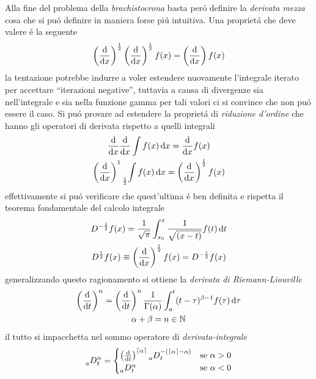 \begin{multicols*}{3}
  Alla fine del problema della \textit{brachistocrona} basta per\'o definire la \textit{derivata mezza}
  cosa che si pu\'o definire in maniera forse pi\'u intuitiva. Una propriet\'a che deve valere \'e la
  seguente
  \begin{equation}
    \left(\dv{x}\right)^{\frac{1}{2}}\left(\dv{x}\right)^{\frac{1}{2}} f(x) = \left(\dv{x}\right)f(x)
  \end{equation}
  la tentazione potrebbe indurre a voler estendere nuovamente l'integrale iterato per accettare
  ``iterazioni negative'', tuttavia a causa di divergenze sia nell'integrale e sia nella funzione gamma
  per tali valori ci si convince che non pu\'o essere il caso.
  Si pu\'o provare ad estendere la propriet\'a di \textit{riduzione d'ordine} che hanno gli operatori di
  derivata rispetto a quelli integrali
  \begin{equation}
    \begin{gathered}
      \dv{x}\dv{x}\int f(x)\dd{x} = \dv{x}f(x) \\
      \left(\dv{x}\right)^1 \prescript{}{\frac{1}{2}}{\int f(x)\dd{x}} = \left(\dv{x}\right)^{\frac{1}{2}} f(x)
    \end{gathered}
  \end{equation}
  effettivamente si pu\'o verificare che quest'ultima \'e ben definita e rispetta il teorema fondamentale del
  calcolo integrale
  \begin{equation}
    \begin{gathered}
      D^{-\frac{1}{2}}f(x) = \frac{1}{\sqrt{\pi}} \int_{x_0}^x \frac{1}{\sqrt{(x-t)}} f(t)\dd{t} \\
      D^{\frac{1}{2}} f(x) \equiv \left(\dv{x}\right)^{\frac{1}{2}} f(x) = D^{-\frac{1}{2}} f(x)
    \end{gathered}
  \end{equation}
  generalizzando questo ragionamento si ottiene la \textit{derivata di Riemann-Liouville}
  \begin{equation}
    \label{eq:cauchy-formula}
    \begin{gathered}
      \left(\dv{t}\right)^{\alpha} = \left(\dv{t}\right)^n\frac{1}{\Gamma(\alpha)} \int_{a}^t (t-\tau)^{\beta-1}f(\tau)\dd{\tau} \\
      \alpha + \beta = n \in \mathbb{N}
    \end{gathered}
  \end{equation}
  il tutto si impacchetta nel sommo operatore di \textit{derivata-integrale}
  \begin{equation}
    \prescript{}{a}{D}_t^{\alpha} =
    \begin{cases}
      \left(\dv{t}\right)^{\lceil\alpha\rceil}\prescript{}{a}{D}_t^{-(\lceil\alpha\rceil-\alpha)} & \text{se } \alpha > 0 \\
      \prescript{}{a}{D}_t^{\alpha} & \text{se } \alpha < 0
    \end{cases}
  \end{equation}


\end{multicols*}
